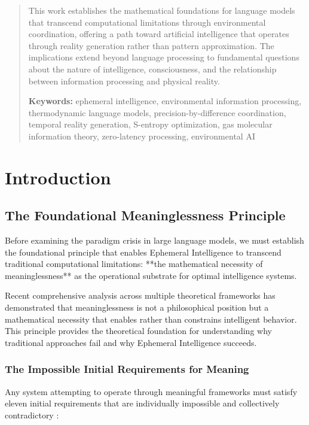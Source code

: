 \documentclass[12pt,a4paper]{article}
\begin{document}
\begin{abstract}
This work establishes the mathematical foundations for language models that transcend computational limitations through environmental coordination, offering a path toward artificial intelligence that operates through reality generation rather than pattern approximation. The implications extend beyond language processing to fundamental questions about the nature of intelligence, consciousness, and the relationship between information processing and physical reality.

\textbf{Keywords:} ephemeral intelligence, environmental information processing, thermodynamic language models, precision-by-difference coordination, temporal reality generation, S-entropy optimization, gas molecular information theory, zero-latency processing, environmental AI
\end{abstract}

\section{Introduction}

\subsection{The Foundational Meaninglessness Principle}

Before examining the paradigm crisis in large language models, we must establish the foundational principle that enables Ephemeral Intelligence to transcend traditional computational limitations: **the mathematical necessity of meaninglessness** as the operational substrate for optimal intelligence systems.

Recent comprehensive analysis across multiple theoretical frameworks \cite{sachikonye2024initial,sachikonye2024meaninglessness,sachikonye2024naked} has demonstrated that meaninglessness is not a philosophical position but a mathematical necessity that enables rather than constrains intelligent behavior. This principle provides the theoretical foundation for understanding why traditional approaches fail and why Ephemeral Intelligence succeeds.

\subsubsection{The Impossible Initial Requirements for Meaning}

Any system attempting to operate through meaningful frameworks must satisfy eleven initial requirements that are individually impossible and collectively contradictory \cite{sachikonye2024initial}:
\end{document}
